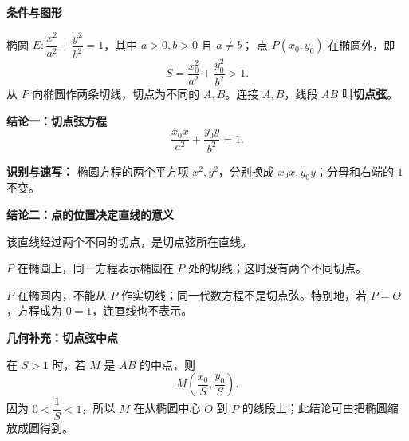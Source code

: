 \begin{statementbox}
    \textbf{\textcolor{CStatement}{条件与图形}}

    椭圆 $E:\dfrac{x^2}{a^2}+\dfrac{y^2}{b^2}=1$，其中 $a>0,b>0$ 且 $a\ne b$；
    点 $P(x_0,y_0)$ 在椭圆外，即
    \[
        S=\frac{x_0^2}{a^2}+\frac{y_0^2}{b^2}>1.
    \]
    从 $P$ 向椭圆作两条切线，切点为不同的 $A,B$。连接 $A,B$，线段 $AB$ 叫\textbf{切点弦}。

    \medskip
    \textbf{\textcolor{CStatement}{结论一：切点弦方程}}
    \[
        \boxed{\frac{x_0x}{a^2}+\frac{y_0y}{b^2}=1.}
    \]

    \textbf{识别与速写：} 椭圆方程的两个平方项 $x^2,y^2$，分别换成 $x_0x,y_0y$；分母和右端的 $1$ 不变。

    \medskip
    \textbf{\textcolor{CStatement}{结论二：点的位置决定直线的意义}}
    \begin{description}[style=nextline, leftmargin=2.8em, labelsep=0.5em, itemsep=0.35em]
        \item[\textbf{当 $S>1$：}] 该直线经过两个不同的切点，是切点弦所在直线。
        \item[\textbf{当 $S=1$：}] $P$ 在椭圆上，同一方程表示椭圆在 $P$ 处的切线；这时没有两个不同切点。
        \item[\textbf{当 $S<1$：}] $P$ 在椭圆内，不能从 $P$ 作实切线；同一代数方程不是切点弦。特别地，若 $P=O$，方程成为 $0=1$，连直线也不表示。
    \end{description}

    \medskip
    \textbf{\textcolor{CStatement}{几何补充：切点弦中点}}

    在 $S>1$ 时，若 $M$ 是 $AB$ 的中点，则
    \[
        \boxed{M\left(\frac{x_0}{S},\frac{y_0}{S}\right)}.
    \]
    因为 $0<\dfrac1S<1$，所以 $M$ 在从椭圆中心 $O$ 到 $P$ 的线段上；此结论可由把椭圆缩放成圆得到。
\end{statementbox}
